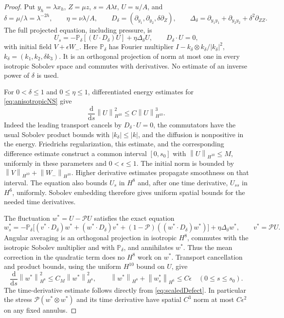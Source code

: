 \documentclass[11pt]{article}
\theoremstyle{remark}
\newcommand{\PP}{\mathcal P}
\newcommand{\norm}[1]{\left\lVert#1\right\rVert}
\begin{document}
\begin{proof}
Put $y_h=\lambda x_h$, $Z=\mu z$, $s=A\lambda t$,
$U=u/A$, and
\[
 \delta=\mu/\lambda=\lambda^{-2h},\qquad
 \eta=\nu\lambda/A,\qquad
 D_\delta=(\partial_{y_1},\partial_{y_2},\delta\partial_Z),\qquad
 \Delta_\delta=\partial_{y_1y_1}+\partial_{y_2y_2}
                                      +\delta^2\partial_{ZZ}.
\]
The full projected equation, including pressure, is
\begin{equation}\label{eq:anisotropicNS}
 U_s=-\mathbb P_\delta[(U\cdot D_\delta)U]
                  +\eta\Delta_\delta U,\qquad
 D_\delta\cdot U=0,
\end{equation}
with initial field $V+\epsilon W_-$. Here $\mathbb P_\delta$ has
Fourier multiplier $I-k_\delta\otimes k_\delta/|k_\delta|^2$,
$k_\delta=(k_1,k_2,\delta k_3)$. It is an orthogonal projection of
norm at most one in every isotropic Sobolev space and commutes with
derivatives. No estimate of an inverse power of $\delta$ is used.

For $0<\delta\leq1$ and $0\leq\eta\leq1$, differentiated energy
estimates for \eqref{eq:anisotropicNS} give
\[
 \frac{\mathrm d}{\mathrm ds}\norm U_{H^{10}}^2
                         \leq C\norm U_{H^{10}}^3.
\]
Indeed the leading transport cancels by $D_\delta\cdot U=0$,
the commutators have the usual Sobolev product bounds with
$|k_\delta|\leq|k|$, and the diffusion is nonpositive in the energy.
Friedrichs regularization, this estimate, and the corresponding
difference estimate construct a common interval $[0,s_0]$ with
$\norm U_{H^{10}}\leq M$, uniformly in these parameters and
$0<\epsilon\leq1$. The initial norm is bounded by
$\norm V_{H^{10}}+\norm{W_-}_{H^{10}}$.
Higher derivative estimates propagate smoothness on that interval.
The equation also bounds $U_s$ in $H^8$ and, after one time
derivative, $U_{ss}$ in $H^6$, uniformly. Sobolev embedding therefore
gives uniform spatial bounds for the needed time derivatives.

The fluctuation $w^*=U-\PP U$ satisfies the exact equation
\begin{equation}\label{eq:scaledDefect}
 w^*_s=-\mathbb P_\delta\big[(v^*\cdot D_\delta)w^*
       +(w^*\cdot D_\delta)v^*
       +(1-\PP)((w^*\cdot D_\delta)w^*)\big]
       +\eta\Delta_\delta w^*,\qquad v^*=\PP U.
\end{equation}
Angular averaging is an orthogonal projection in isotropic $H^8$,
commutes with the isotropic Sobolev multiplier and with
$\mathbb P_\delta$, and annihilates $w^*$. Thus the mean correction
in the quadratic term does no $H^8$ work on $w^*$.
Transport cancellation and product bounds, using the uniform $H^{10}$
bound on $U$, give
\[
 \frac{\mathrm d}{\mathrm ds}\norm{w^*}_{H^8}^2
        \leq C_M\norm{w^*}_{H^8}^2,\qquad
 \norm{w^*}_{H^8}+\norm{w^*_s}_{H^6}\leq C\epsilon
                         \quad(0\leq s\leq s_0).
\]
The time-derivative estimate follows directly from
\eqref{eq:scaledDefect}. In particular the stress
$\PP(w^*\otimes w^*)$ and its time derivative have spatial $C^3$
norm at most $C\epsilon^2$ on any fixed annulus.


\end{proof}
\end{document}
